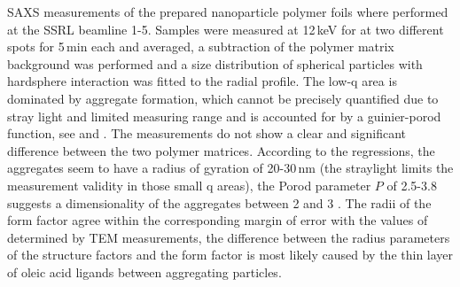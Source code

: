 SAXS measurements of the prepared nanoparticle polymer foils where performed at the SSRL beamline 1-5. Samples were measured at 12\,keV for at two different spots for 5\,min each and averaged, a subtraction of the polymer matrix background was performed and a size distribution of spherical particles with hardsphere interaction was fitted to the radial profile. The low-q area is dominated by aggregate formation, which cannot be precisely quantified due to stray light and limited measuring range and is accounted for by a guinier-porod function, see   and   \cite{percus1958,feigin1987,Ilavsky2009}.
The measurements do not show a clear and significant difference between the two polymer matrices. According to the regressions, the aggregates seem to have a radius of gyration of 20-30\,nm (the straylight limits the measurement validity in those small q areas), the Porod parameter $P$ of 2.5-3.8 suggests a dimensionality of the aggregates between 2 and 3 \cite{feigin1987,lili2005}. The radii of the form factor agree within the corresponding margin of error with the values of determined by TEM measurements, the difference between the radius parameters of the structure factors and the form factor is most likely caused by the thin layer of oleic acid ligands between aggregating particles.


